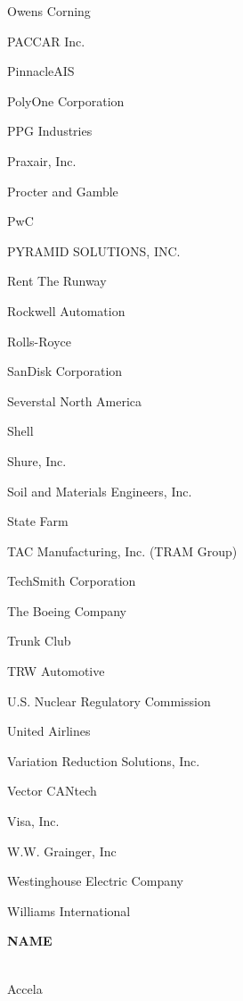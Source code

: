 \documentclass[twoside]{article}
\begin{document}
\begin{center}
\begin{multicols}{5}
\begin{FlushLeft}
\begin{compactitem}
\item Owens Corning
\item PACCAR Inc.
\item PinnacleAIS
\item PolyOne Corporation
\item PPG Industries
\item Praxair, Inc.
\item Procter and Gamble
\item PwC
\item PYRAMID SOLUTIONS, INC.
\item Rent The Runway
\item Rockwell Automation
\item Rolls-Royce
\item SanDisk Corporation
\item Severstal North America
\item Shell
\item Shure, Inc.
\item Soil and Materials Engineers, Inc.
\item State Farm
\item TAC Manufacturing, Inc. (TRAM Group)
\item TechSmith Corporation
\item The Boeing Company
\item Trunk Club
\item TRW Automotive
\item U.S. Nuclear Regulatory Commission
\item United Airlines
\item Variation Reduction Solutions, Inc.
\item Vector CANtech
\item Visa, Inc.
\item W.W. Grainger, Inc
\item Westinghouse Electric Company
\item Williams International
\end{compactitem}
        \end{FlushLeft}
        \vspace{1em}
        {\fontsize{14}{16}\selectfont \bf NAME}\\
        \vspace{-1em}
        ~\hrulefill~
        \vspace{-.9em}
        \begin{FlushLeft}
        \begin{compactitem}
        \item Accela

\end{compactitem}
\end{FlushLeft}
\end{multicols}
\end{center}
\end{document}
